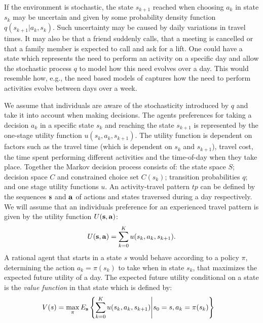 If the environment is stochastic, the state $s_{k+1}$ reached when choosing $a_k$ in state $s_k$ may be uncertain and given by some probability density function $q(s_{k+1}|a_k,s_k)$. Such uncertainty may be caused by daily variations in travel times. It may also be that a friend suddenly calls, that a meeting is cancelled or that a family member is expected to call and ask for a lift. One could have a state which represents the need to perform an activity on a specific day and allow the stochastic process $q$ to model how this need evolves over a day. This would resemble how, e.g., the need based models of \citet{arentze11} captures how the need to perform activities evolve between days over a week. 

We assume that individuals are aware of the stochasticity introduced by $q$ and take it into account when making decisions. The agents preferences for taking a decision $a_k$ in a specific state $s_k$ and reaching the state $s_{k+1}$ is represented by the one-stage utility function $u(s_k,a_k,s_{k+1})$. The utility function is dependent on factors such as the travel time (which is dependent on $s_k$ and $s_{k+1}$), travel cost, the time spent performing different activities and the time-of-day when they take place. Together the Markov decision process consists of: the state space $S$; decision space $C$ and constrained choice set $C(s_k)$; transition probabilities $q$; and one stage utility functions $u$. An activity-travel pattern $tp$ can be defined by the sequences $\mathbf{s}$ and $\mathbf{a}$ of actions and states traversed during a day respectively. We will assume that an individuals preference for an experienced travel pattern is given by the utility function $U(\mathbf{s},\mathbf{a})$:
\begin{equation}
    U(\bs,\ba) = \sum_{k=0}^K u(s_k,a_k,s_{k+1}).
\end{equation}
A rational agent that starts in a state $s$ would behave according to a policy $\pi$, determining the action $a_k=\pi(s_k)$ to take when in state $s_k$, that maximizes the expected future utility  of a day. The expected future utility conditional on a state is the \emph{value function} in that state which is defined by: 
\begin{equation}\label{eq:vf}
\begin{aligned}
V(s) & = \max_{\pi} E_{\bs} \left\{ \sum_{k=0}^K u(s_k,a_k,s_{k+1})\middle | s_0 = s, a_k=\pi(s_k) \right\}  
\end{aligned}
\end{equation}
